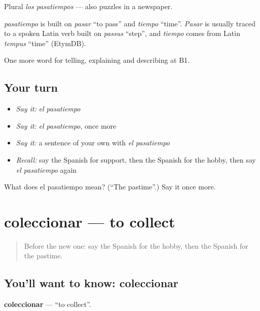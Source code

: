 Plural \emph{los pasatiempos} — also puzzles in a newspaper.

\begin{cousinweb}
\emph{pasatiempo} is built on \emph{pasar} \textquotedblleft{}to pass\textquotedblright{} and \emph{tiempo} \textquotedblleft{}time\textquotedblright{}. \emph{Pasar} is usually traced to a spoken Latin verb built on \emph{passus} \textquotedblleft{}step\textquotedblright{}, and \emph{tiempo} comes from Latin \emph{tempus} \textquotedblleft{}time\textquotedblright{} (EtymDB).
\end{cousinweb}

\begin{grammarlens}[title={What you've built}]
One more word for telling, explaining and describing at B1.
\end{grammarlens}

\subsection*{Your turn}
\begin{itemize}
\raggedright
  \item \emph{Say it:} \emph{el pasatiempo}
  \item \emph{Say it:} \emph{el pasatiempo}, once more
  \item \emph{Say it:} a sentence of your own with \emph{el pasatiempo}
  \item \emph{Recall:} say the Spanish for support, then the Spanish for the hobby, then say \emph{el pasatiempo} again
\end{itemize}

\begin{tcolorbox}[breakable,colback=teal!4,colframe=teal!35!black,title={Before you move on}]
What does el pasatiempo mean? (\textquotedblleft{}The pastime\textquotedblright{}.) Say it once more.
\end{tcolorbox}
\section[coleccionar]{coleccionar — to collect}

\label{lesson:ES-C751-coleccionar}



\begin{quote}
Before the new one: say the Spanish for the hobby, then the Spanish for the pastime.
\end{quote}

\subsection*{You'll want to know: coleccionar}
\textbf{coleccionar} — \textquotedblleft{}to collect\textquotedblright{}.

